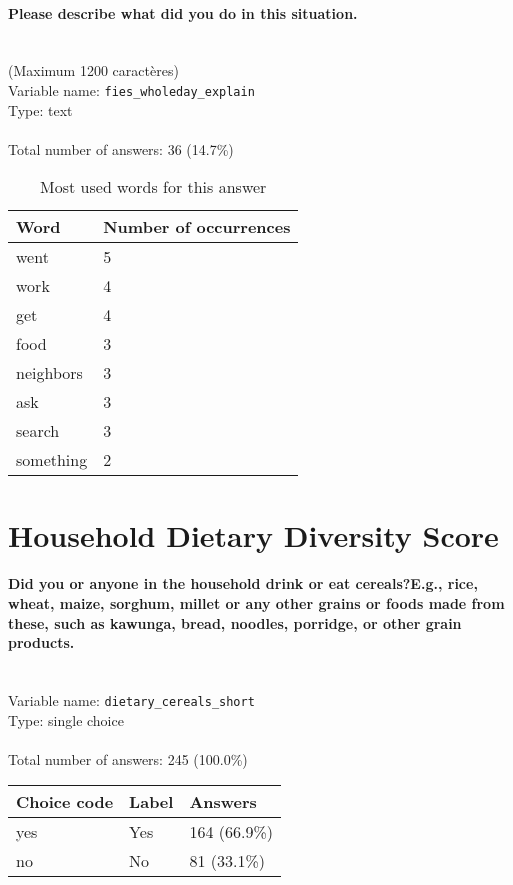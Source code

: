 \documentclass[11.5pt, a4paper]{scrartcl}
\begin{document}
\paragraph{Please describe what did you do in this situation.}
\ \\ {\small (Maximum 1200 caractères)}
\  \\Variable name: \texttt{fies\_wholeday\_explain}\\
Type: text\\
\\Total number of answers: 36 (14.7\%)
\\[0.2em]\begin{table}[H]
 \begin{tabular}{p{4cm}|p{8cm}}
Word & Number of occurrences  \\
\hline
\cellcolor{mygray}went&\cellcolor{mygray}5\\
\hline
work&4\\
\hline
\cellcolor{mygray}get&\cellcolor{mygray}4\\
\hline
food&3\\
\hline
\cellcolor{mygray}neighbors&\cellcolor{mygray}3\\
\hline
ask&3\\
\hline
\cellcolor{mygray}search&\cellcolor{mygray}3\\
\hline
something&2\\
\hline
\end{tabular}
\caption{\label{tab:table-name} Most used words for this answer}
\end{table}
\newpage\section{Household Dietary Diversity Score}
\paragraph{Did you or anyone in the household drink or eat cereals?E.g., rice, wheat, maize, sorghum, millet or any other grains or foods made from these, such as kawunga, bread, noodles, porridge, or other grain products.}
\  \\Variable name: \texttt{dietary\_cereals\_short}\\
Type: single choice\\
\\Total number of answers: 245 (100.0\%)
\\[0.2em] \begin{tabular}{p{4cm}|p{8cm}|p{3cm}}
Choice code & Label & Answers \\
\hline
yes & Yes& \cellcolor{color3}164 (66.9\%)\\
\cellcolor{mygray} no & \cellcolor{mygray}No & \cellcolor{color1}81 (33.1\%)\\
\end{tabular}
\end{document}
